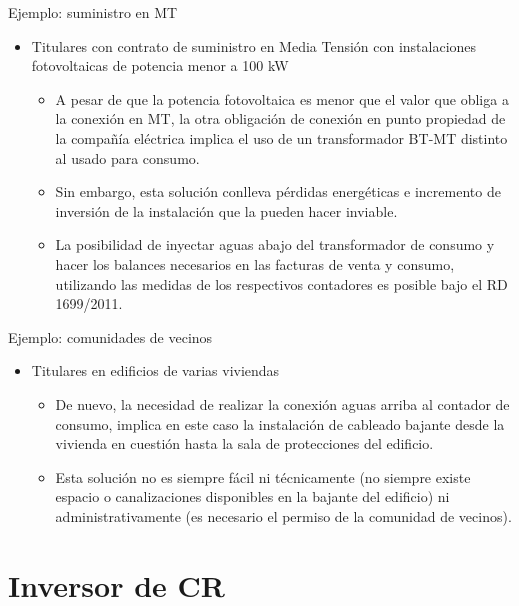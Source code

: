 \documentclass[xcolor={usenames,svgnames,dvipsnames}]{beamer}
\begin{document}
\begin{frame}[label=sec-1-4-5]{Ejemplo: suministro en MT}
\begin{itemize}
\item \alert{Titulares con contrato de suministro en Media Tensión con instalaciones fotovoltaicas de potencia menor a 100 kW}

\begin{itemize}
\item A pesar de que la potencia fotovoltaica es menor que el valor que obliga a la conexión en MT, la otra obligación de conexión en punto propiedad de la compañía eléctrica implica el uso de un transformador BT-MT distinto al usado para consumo.

\item Sin embargo, esta solución conlleva pérdidas energéticas e incremento de inversión de la instalación que la pueden hacer inviable.

\item La posibilidad de inyectar aguas abajo del transformador de consumo y hacer los balances necesarios en las facturas de venta y consumo, utilizando las medidas de los respectivos contadores es posible bajo el RD 1699/2011.
\end{itemize}
\end{itemize}
\end{frame}

\begin{frame}[label=sec-1-4-6]{Ejemplo: comunidades de vecinos}
\begin{itemize}
\item \alert{Titulares en edificios de varias viviendas}

\begin{itemize}
\item De nuevo, la necesidad de realizar la conexión aguas arriba al contador de consumo, implica en este caso la instalación de cableado bajante desde la vivienda en cuestión hasta la sala de protecciones del edificio.

\item Esta solución no es siempre fácil ni técnicamente (no siempre existe espacio o canalizaciones disponibles en la bajante del edificio) ni administrativamente (es necesario el permiso de la comunidad de vecinos).
\end{itemize}
\end{itemize}
\end{frame}

\section{Inversor de CR}
\label{sec-2}
\end{document}
